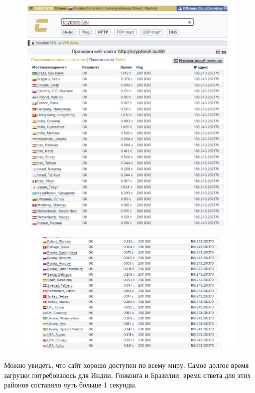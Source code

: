 \documentclass[a4paper, 12pt]{article}
\begin{document}
\newpage
\begin{figure}[h!]
    \noindent
    \centering
    \includegraphics[width=1\linewidth]{pic_ping_1.png}
    \caption{}
\end{figure}

\newpage
\begin{figure}[h!]
    \noindent
    \centering
    \includegraphics[width=1\linewidth]{pic_ping_2.png}
    \caption{}
\end{figure}

Можно увидеть, что сайт хорошо доступен по всему миру. Самое долгое время загрузки потребовалось для Индии, Гонконга и Бразилии, время ответа для этих районов составило чуть больше 1 секунды.
\end{document}
